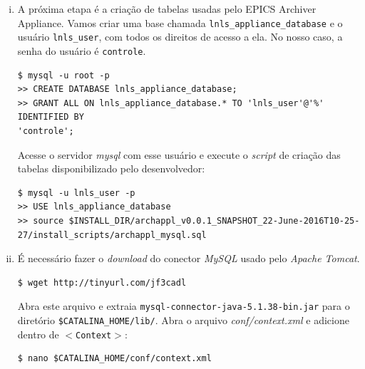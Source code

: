 \begin {enumerate}[i.]
As três últimas variáveis devem ser corretamente configuradas de acordo com a
disponibilidade de equipamentos, por exemplo. No nosso caso, um único diretório
é usado para os três tipos de armazenamento, sendo ele \texttt{lnls-archiver-storage/}.

\item \label{mysql-install}A próxima etapa é a criação de tabelas usadas pelo
EPICS Archiver Appliance. Vamos criar uma base chamada \texttt{lnls\_appliance\_database} e o
usuário \texttt{lnls\_user}, com todos os direitos de acesso a ela. No nosso
caso, a senha do usuário é \texttt{controle}. 

\begin{lstlisting}[basicstyle=\fontsize{9}{13}\selectfont\ttfamily,keywordstyle=\ttfamily,
style=nonumbers] 
$ mysql -u root -p
>> CREATE DATABASE lnls_appliance_database;
>> GRANT ALL ON lnls_appliance_database.* TO 'lnls_user'@'%' IDENTIFIED BY
'controle';
\end{lstlisting}

Acesse o servidor \textit{mysql} com esse usuário e execute o \textit{script}
de criação das tabelas disponibilizado pelo desenvolvedor:

\begin{lstlisting}[basicstyle=\fontsize{9}{13}\selectfont\ttfamily,keywordstyle=\ttfamily,
style=nonumbers] 
$ mysql -u lnls_user -p
>> USE lnls_appliance_database
>> source $INSTALL_DIR/archappl_v0.0.1_SNAPSHOT_22-June-2016T10-25-27/install_scripts/archappl_mysql.sql
\end{lstlisting}

\item É necessário fazer o \textit{download} do conector \textit{MySQL} usado
pelo \textit{Apache Tomcat}.

\begin{lstlisting}[keywordstyle=\ttfamily, style=nonumbers]
$ wget http://tinyurl.com/jf3cadl
\end{lstlisting} 

Abra este arquivo e extraia \texttt{mysql-connector-java-5.1.38-bin.jar} para o
diretório \texttt{\$CATALINA\_HOME/lib/}. Abra o arquivo
\textit{conf/context.xml} e adicione dentro de \texttt{\(<\)Context\(>\)}:

\begin{lstlisting}[keywordstyle=\ttfamily, style=nonumbers]
$ nano $CATALINA_HOME/conf/context.xml


\end{lstlisting}
\end{enumerate}
